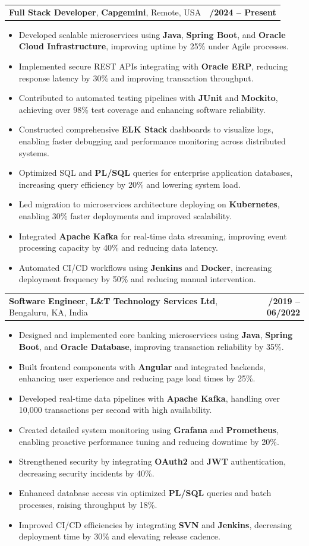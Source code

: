 \documentclass[letterpaper,11pt]{article}
\makeatletter
\newcommand{\resumeItem}[1]{
  \item\footnotesize{
    {#1 \vspace{-2pt}}
  }
}
\newcommand{\resumeSubheading}[4]{
  \vspace{-2pt}\item
    \begin{tabular*}{1.0\textwidth}[t]{l@{\extracolsep{\fill}}r}
      \textbf{\fontsize{10pt}{14pt}\selectfont #3}, \textbf{\fontsize{10pt}{14pt}\selectfont #1}, \fontsize{10pt}{14pt}\selectfont #4 & \textbf{\fontsize{10pt}{14pt}\selectfont #2} \\
    \end{tabular*}\vspace{-7pt}
}
\newcommand{\resumeItemListStart}{\begin{itemize}[leftmargin=*]}
\newcommand{\resumeItemListEnd}{\end{itemize}\vspace{-5pt}}
\makeatother
\begin{document}
    \resumeSubheading
        {Capgemini}{01/2024 -- Present}
        {Full Stack Developer}{Remote, USA}
      \resumeItemListStart
        \resumeItem{Developed scalable microservices using \textbf{Java}, \textbf{Spring Boot}, and \textbf{Oracle Cloud Infrastructure}, improving uptime by 25\% under Agile processes.}
        \resumeItem{Implemented secure REST APIs integrating with \textbf{Oracle ERP}, reducing response latency by 30\% and improving transaction throughput.}
        \resumeItem{Contributed to automated testing pipelines with \textbf{JUnit} and \textbf{Mockito}, achieving over 98\% test coverage and enhancing software reliability.}
        \resumeItem{Constructed comprehensive \textbf{ELK Stack} dashboards to visualize logs, enabling faster debugging and performance monitoring across distributed systems.}
        \resumeItem{Optimized SQL and \textbf{PL/SQL} queries for enterprise application databases, increasing query efficiency by 20\% and lowering system load.}
        \resumeItem{Led migration to microservices architecture deploying on \textbf{Kubernetes}, enabling 30\% faster deployments and improved scalability.}
        \resumeItem{Integrated \textbf{Apache Kafka} for real-time data streaming, improving event processing capacity by 40\% and reducing data latency.}
        \resumeItem{Automated CI/CD workflows using \textbf{Jenkins} and \textbf{Docker}, increasing deployment frequency by 50\% and reducing manual intervention.}
      \resumeItemListEnd

    \resumeSubheading
        {L\&T Technology Services Ltd}{08/2019 -- 06/2022}
        {Software Engineer}{Bengaluru, KA, India}
      \resumeItemListStart
        \resumeItem{Designed and implemented core banking microservices using \textbf{Java}, \textbf{Spring Boot}, and \textbf{Oracle Database}, improving transaction reliability by 35\%.}
        \resumeItem{Built frontend components with \textbf{Angular} and integrated backends, enhancing user experience and reducing page load times by 25\%.}
        \resumeItem{Developed real-time data pipelines with \textbf{Apache Kafka}, handling over 10,000 transactions per second with high availability.}
        \resumeItem{Created detailed system monitoring using \textbf{Grafana} and \textbf{Prometheus}, enabling proactive performance tuning and reducing downtime by 20\%.}
        \resumeItem{Strengthened security by integrating \textbf{OAuth2} and \textbf{JWT} authentication, decreasing security incidents by 40\%.}
        \resumeItem{Enhanced database access via optimized \textbf{PL/SQL} queries and batch processes, raising throughput by 18\%.}
        \resumeItem{Improved CI/CD efficiencies by integrating \textbf{SVN} and \textbf{Jenkins}, decreasing deployment time by 30\% and elevating release cadence.}
      \resumeItemListEnd
\end{document}
